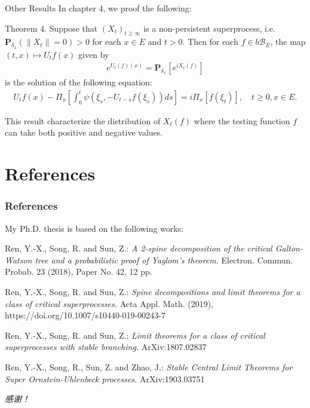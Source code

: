 \documentclass[xcolor=dvipsnames]{beamer}
\begin{document}
\begin{frame}{Other Results}
In chapter 4, we proof the following:
\begin{block}{Theorem 4.}
  Suppose that $(X_t)_{t\geq \infty}$ is a non-persistent superprocess, i.e. $\mathbf P_{\delta_x}(\|X_t\| = 0) >0$ for each $x\in E$ and $t>0$. Then for each $f\in b\mathscr B_E$, the map $(t,x) \mapsto U_tf(x)$ given by
  \begin{align}
    e^{U_t( f)(x)} = \mathbf P_{\delta_x}[e^{i X_t(f)}]
  \end{align}
is the solution of the following equation:
\begin{align}
  U_tf(x) - \Pi_{x}\left[ \int_0^t \psi\left(\xi_s, - U_{t-s} f(\xi_s)\right) ds \right]
= i \Pi_x[f(\xi_t)], \quad t\geq 0, x\in E.
\end{align}
\end{block}
This result characterize the distribution of $X_t(f)$ where the testing function $f$ can take both positive and negative values.
\end{frame}

\section{References}
\begin{frame}
\frametitle<presentation>{References}
    
My Ph.D. thesis is based on the following works:
\begin{thebibliography}{10} 
    
\beamertemplatearticlebibitems
  
  Ren, Y.-X., Song, R. and Sun, Z.:
  \emph{A 2-spine decomposition of the critical Galton-Watson tree and a probabilistic proof of Yaglom's theorem.}
  Electron. Commun. Probab. 23 (2018), Paper No. 42, 12 pp.
 
  Ren, Y.-X., Song, R. and Sun, Z.:
  \emph{Spine decompositions and limit theorems for a class of critical superprocesses.}
  Acta Appl. Math. (2019), https://doi.org/10.1007/s10440-019-00243-7

  Ren, Y.-X., Song, R. and Sun, Z.:
  \emph{Limit theorems for a class of critical superprocesses with stable branching.} ArXiv:1807.02837

    Ren, Y.-X., Song, R., Sun, Z. and Zhao, J.:
    \emph{Stable Central Limit Theorems for Super Ornstein-Uhlenbeck processes.}
    ArXiv:1903.03751

  \end{thebibliography}
\end{frame}

\begin{frame}
  \centering \Large
  \emph{感谢！}
\end{frame}
\end{document}

